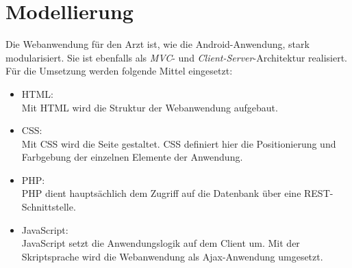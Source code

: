 

\section{Modellierung} 

Die Webanwendung f\"ur den Arzt ist, wie die Android-Anwendung, stark modularisiert.
Sie ist ebenfalls als \emph{MVC}- und \emph{Client-Server}-Architektur realisiert.
F\"ur die Umsetzung werden folgende Mittel eingesetzt:

\begin{itemize}
 \item HTML:\\
 Mit HTML wird die Struktur der Webanwendung aufgebaut.
 
 \item CSS:\\
 Mit CSS wird die Seite gestaltet. 
 CSS definiert hier die Positionierung und Farbgebung der einzelnen Elemente der Anwendung.
 
 \item PHP:\\
 PHP dient haupts\"achlich dem Zugriff auf die Datenbank \"uber eine REST-Schnittstelle.
 
 \item JavaScript:\\
 JavaScript setzt die Anwendungslogik auf dem Client um. 
 Mit der Skriptsprache wird die Webanwendung als Ajax-Anwendung umgesetzt.
\end{itemize}




